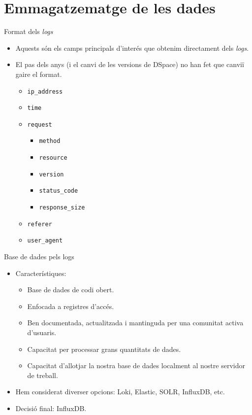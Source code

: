 \section{Emmagatzematge de les dades}\label{sec:data-storing}

\begin{frame}{Format dels \textit{logs}}

    \begin{itemize}
        \item Aquests són els camps principals d'interés que obtenim directament dels \textit{logs}.
        \item El pas dels anys (i el canvi de les versions de DSpace) no han fet que canviï gaire el format.
        \begin{itemize}
            \item \texttt{ip\_address}
            \item \texttt{time}
            \item \texttt{request}
            \begin{itemize}
                \item \texttt{method}
                \item \texttt{resource}
                \item \texttt{version}
                \item \texttt{status\_code}
                \item \texttt{response\_size}
            \end{itemize}
            \item \texttt{referer}
            \item \texttt{user\_agent}
        \end{itemize}
    \end {itemize}
\end{frame}


\begin{frame}{Base de dades pels logs}
    \begin{itemize}%
        \item Característiques:
        \begin{itemize}
            \item Base de dades de codi obert.
            \item Enfocada a registres d'accés.
            \item Ben documentada, actualitzada i mantinguda per una comunitat activa d'usuaris.
            \item Capacitat per processar grans quantitats de dades.
            \item Capacitat d'allotjar la nostra base de dades localment al nostre servidor de treball.
        \end{itemize}
        \item Hem considerat diverser opcions: Loki, Elastic, SOLR, InfluxDB, etc.
        \item Decisió final: InfluxDB.
    \end{itemize}
\end{frame}

